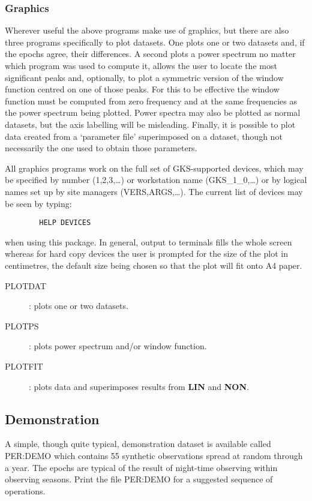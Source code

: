 \subsubsection {Graphics}
Wherever useful the above programs make use of graphics, but there are also
three programs specifically to plot datasets.
One plots one or two datasets and, if the epochs agree, their differences.
A second plots a power spectrum no matter which program was used to compute it,
allows the user to locate the most significant peaks and, optionally, to plot a
symmetric version of the window function centred on one of those peaks.
For this to be effective the window function must be computed from zero
frequency and at the same frequencies as the power spectrum being plotted.
Power spectra may also be plotted as normal datasets, but the axis labelling
will be misleading.
Finally, it is possible to plot data created from a `parameter file'
superimposed on a dataset, though not necessarily the one used to obtain those
parameters.

All graphics programs work on the full set of GKS-supported devices, which may
be specified by number (1,2,3,\ldots) or workstation name (GKS\_1\_0,\ldots) or
by logical names set up by site managers (VERS,ARGS,\ldots).
The current list of devices may be seen by typing:
\begin{verbatim}
        HELP DEVICES
\end{verbatim}
when using this package.
In general, output to terminals fills the whole screen whereas for hard copy
devices the user is prompted for the size of the plot in centimetres, the
default size being chosen so that the plot will fit onto A4 paper.
\begin{description}
\begin{description}
\item [PLOTDAT]: plots one or two datasets.
\item [PLOTPS]: plots power spectrum and/or window function.
\item [PLOTFIT]: plots data and superimposes results from {\bf LIN} and
{\bf NON}.
\end{description}
\end{description}
\subsection {Demonstration}
A simple, though quite typical, demonstration dataset is available called
PER:DEMO which contains 55 synthetic observations spread at random through a
year.
The epochs are typical of the result of night-time observing within observing
seasons.
Print the file PER:DEMO for a suggested sequence of operations.
